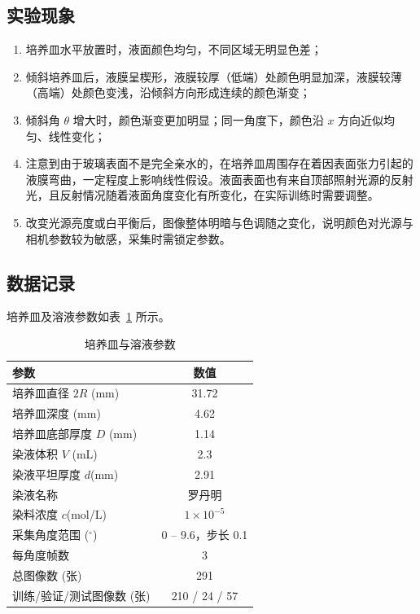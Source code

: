 \documentclass[11pt]{article}
\begin{document}
\subsection{实验现象}
\begin{enumerate}
	\item 培养皿水平放置时，液面颜色均匀，不同区域无明显色差；
	\item 倾斜培养皿后，液膜呈楔形，液膜较厚（低端）处颜色明显加深，液膜较薄（高端）处颜色变浅，沿倾斜方向形成连续的颜色渐变；
	\item 倾斜角 $\theta$ 增大时，颜色渐变更加明显；同一角度下，颜色沿 $x$ 方向近似均匀、线性变化；
	\item 注意到由于玻璃表面不是完全亲水的，在培养皿周围存在着因表面张力引起的液膜弯曲，一定程度上影响线性假设。液面表面也有来自顶部照射光源的反射光，且反射情况随着液面角度变化有所变化，在实际训练时需要调整。
	\item 改变光源亮度或白平衡后，图像整体明暗与色调随之变化，说明颜色对光源与相机参数较为敏感，采集时需锁定参数。
\end{enumerate}

\subsection{数据记录}
培养皿及溶液参数如表~\ref{tab:para} 所示。
\begin{table}[H]
	\centering
	\caption{培养皿与溶液参数}
	\label{tab:para}
	\begin{tabular}{lc}
		\toprule
		参数 & 数值 \\ \midrule
		培养皿直径 $2R$ (mm) & 31.72 \\
		培养皿深度 (mm) & 4.62 \\
		培养皿底部厚度 $D$ (mm) & 1.14 \\
		染液体积 $V$ (mL) & 2.3 \\
		染液平坦厚度 $d$(mm) & 2.91\\
		染液名称 & 罗丹明 \\
		染料浓度 $c$(mol/L) & $1\times 10^{-5}$ \\
		采集角度范围 ($^\circ$) & 0 -- 9.6，步长 0.1 \\
		每角度帧数 & 3 \\
		总图像数 (张) & 291\\
		训练/验证/测试图像数 (张) & 210 / 24 / 57 \\
		\bottomrule
	\end{tabular}
\end{table}
\end{document}
